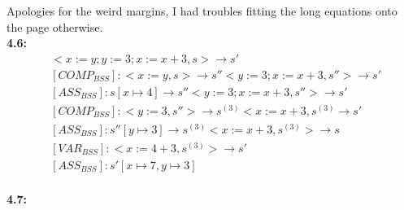 


Apologies for the weird margins, I had troubles fitting the long equations onto the page otherwise. \\

\noindent\textbf{4.6: }
\begin{align*}
    & <x:=y;y:=3;x:=x+3,s> \to s' \\
    & [COMP_{BSS}]: <x:=y,s>\to s''  <y:=3;x:=x+3,s''> \to s' \\
    & [ASS_{BSS}]: s[x \mapsto 4]\to s''  <y:=3;x:=x+3,s''> \to s' \\
    & [COMP_{BSS}]: <y:=3, s''>\to s^{(3)}  <x:=x+3,s^{(3)} \to s' \\
    & [ASS_{BSS}]: s''[y\mapsto3] \to s^{(3)}  <x:=x+3,s^{(3)}> \to s \\
    & [VAR_{BSS}]: <x:=4+3,s^{(3)}> \to s'  \\
    & [ASS_{BSS}]: s'[x\mapsto7,y\mapsto3]
\end{align*} \\
\noindent\textbf{4.7: }
